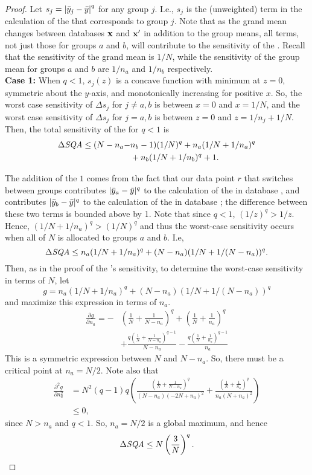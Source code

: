 \begin{proof}
Let $s_{j} =  \left\vert \bar{y}_{j} - \bar{y} \right\vert ^q$ for any group $j$. I.e., $s_{j}$ is the (unweighted) term in the calculation of the \sqa that corresponds to group $j$. Note that as the grand mean changes between databases $\mathbf{x}$ and $\mathbf{x'}$ in addition to the group means, all terms, not just those for groups $a$ and $b$, will contribute to the sensitivity of the \sqa. Recall that the sensitivity of the grand mean is $1/N$, while the sensitivity of the group mean for groups $a$ and $b$ are $1/n_a$ and $1/n_b$ respectively. \\

\noindent\textbf{Case 1:} When $q<1$, $s_j(z)$ is a concave function with minimum at $z=0$, symmetric about the $y$-axis, and monotonically increasing for positive $x$. So, the worst case sensitivity of $\Delta s_j$ for $j \ne a,b$ is between $x=0$ and $x=1/N$, and the worst case sensitivity of $\Delta s_j$ for $j = a,b$ is between $z=0$ and $z=1/n_j + 1/N$. Then, the total sensitivity of the \sqa for $q<1$ is
%
\begin{align*}
 \Delta\textit{SQA} \le  (N-n_a-&n_b-1)(1/N)^q + n_a(1/N + 1/n_a)^q \\
 &+ n_b(1/N + 1/n_b)^q + 1 .
\end{align*}

The addition of the $1$ comes from the fact that our data point $r$ that switches between groups contributes $\vert \bar{y}_a - \bar{y} \vert^q$ to the calculation of the \sqa in database \x, and contributes $\vert \bar{y}_b - \bar{y} \vert^q$ to the calculation of the \sqa in database \xprime; the difference between these two terms is bounded above by 1. Note that since $q<1$, $(1/z)^q > 1/z$. Hence, $(1/N + 1/n_a)^q > (1/N)^q$ and thus the worst-case sensitivity occurs when all of $N$ is allocated to groups $a$ and $b$. I.e,
%
$$ \Delta\textit{SQA} \le n_a(1/N + 1/n_a)^q + (N-n_a)(1/N + 1/(N-n_a))^q. $$
Then, as in the proof of the \sqe's sensitivity, to determine the worst-case sensitivity in terms of $N$, let 
$$g = n_a(1/N + 1/n_a)^q + (N-n_a)(1/N + 1/(N-n_a))^q $$
and maximize this expression in terms of $n_a$.
\begin{align*}
\frac{\partial g}{\partial n_a} = -&\left(\frac{1}{N} + \frac{1}{N-n_a}\right)^q + \left(\frac{1}{N} + \frac{1}{n_a}\right)^q \\
&+ \frac{q\left(\frac{1}{N} + \frac{1}{N-n_a}\right)^{q-1}}{N-n_a} - \frac{q\left(\frac{1}{N} + \frac{1}{n_a}\right)^{q-1}}{n_a}
\end{align*}
This is a symmetric expression between $N$ and $N-n_a$. So, there must be a critical point at $n_a = N/2$. Note also that
\begin{align*}
\frac{\partial^2 g}{\partial n_a^2} &= N^2(q-1)q \left( \frac{(\frac{1}{N} + \frac{1}{N-n_a})^q}{(N-n_a)(-2N+n_a)^2} + \frac{\left(\frac{1}{N} + \frac{1}{n_a}\right)^q}{n_a(N+n_a)^2}\right) \\
	&\le 0,
\end{align*}
since $N>n_a$ and $q<1$. So, $n_a = N/2$ is a global maximum, and hence
%
$$\Delta\textit{SQA} \le N \left( \frac{3}{N} \right)^q.$$


\end{proof}
